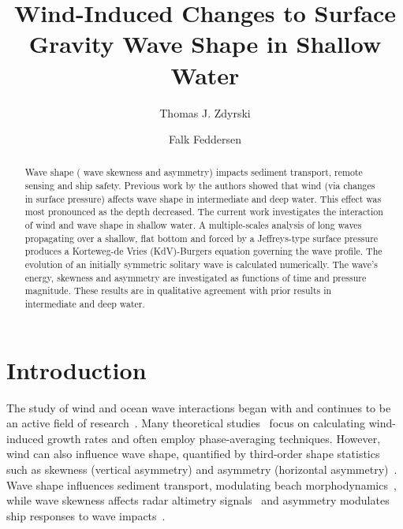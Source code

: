 \documentclass{jfm}
\title{Wind-Induced Changes to Surface Gravity Wave Shape in Shallow Water}
\author{Thomas J. Zdyrski \and Falk Feddersen}
\begin{document}
\maketitle

\begin{abstract}
Wave shape (\eg{} wave skewness and asymmetry) impacts sediment
transport, remote sensing and ship safety.
Previous work by the authors showed that wind (via changes in surface
pressure) affects wave shape in intermediate and deep water.
This effect was most pronounced as the depth decreased.
The current work investigates the interaction of wind and wave shape in
shallow water.
A multiple-scales analysis of long waves propagating over a shallow,
flat bottom and forced by a Jeffreys-type surface pressure produces a
Korteweg-de Vries (KdV)-Burgers equation governing the wave profile.
The evolution of an initially symmetric solitary wave is calculated
numerically.
The wave's energy, skewness and asymmetry are investigated as functions
of time and pressure magnitude.
These results are in qualitative agreement with prior results in
intermediate and deep water.
\end{abstract}

\section{Introduction}

The study of wind and ocean wave interactions began with
\citet{jeffreys1925formation} and continues to be an active field of
research~\citep[\eg][]{janssen1991quasi,donelan2004limiting,sulivan2010dynamics}.
Many theoretical
studies~\citep[\eg][]{jeffreys1925formation,miles1957generation,phillips1957generation}
focus on calculating wind-induced growth rates and often employ
phase-averaging techniques.
However, wind can also influence wave shape, quantified by third-order
shape statistics such as skewness (vertical asymmetry) and asymmetry
(horizontal asymmetry)~\citep[\eg][]{leykin1995asymmetry,feddersen2005wind,zdyrski2020wind}.
Wave shape influences sediment transport, modulating beach
morphodynamics~\citep[\eg][]{drake2001discrete,hoefel2003wave}, while
wave skewness affects radar altimetry
signals~\citep[\eg][]{hayne1980radar} and asymmetry modulates ship
responses to wave impacts~\citep[\eg][]{soares2008abnormal}.
\end{document}
